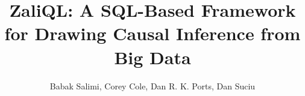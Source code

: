 
\title{ZaliQL: A SQL-Based Framework for Drawing Causal Inference from Big Data}


\author{
    Babak Salimi,
    Corey Cole,
    Dan R. K. Ports,
    Dan Suciu
}

